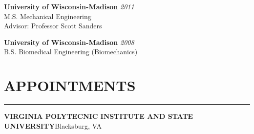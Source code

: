 \documentclass[11pt,letterpaper]{article}
\begin{document}
\vspace{3mm}
\begin{minipage}{0.45\columnwidth}
{\bf University of Wisconsin-Madison} \hfill {\em2011} \\ 
\hspace{5mm} M.S. Mechanical Engineering \\
\hspace{10mm} Advisor: Professor Scott Sanders\\
\end{minipage}%
\hfil
\begin{minipage}{0.47\columnwidth}
{\bf University of Wisconsin-Madison} \hfill {\em2008} \\ 
\hspace{5mm}B.S. Biomedical Engineering (Biomechanics)
\end{minipage}


\section*{APPOINTMENTS}\vspace{-3mm}
\hrule
\MakeUppercase{\bf Virginia Polytecnic Institute and State University}\hfill{Blacksburg, VA }\\
\end{document}
